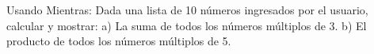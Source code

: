 ﻿
Usando Mientras: Dada una lista de 10 números ingresados por el usuario, calcular y mostrar: a) La suma de todos los números múltiplos de 3. b) El producto de todos los números múltiplos de 5.


\newpage
{}

\volverindice
\newpage
